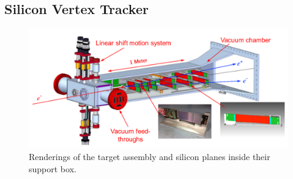 \documentclass[b1]{sciposter}
\begin{document}
\begin{multicols}{3}








	\subsection*{Silicon Vertex Tracker}
	\begin{figure}
		\begin{center}
			\includegraphics[width=1.0\textwidth]{svt_2014_labelled}
		\end{center}
		\caption{Renderings of the target assembly and silicon planes inside their support box.}
	\end{figure}


\end{multicols}
\end{document}
